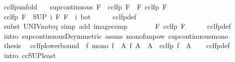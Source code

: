 \begin{isabellebody}
\isanewline
{}\isamarkupfalse%
\ cclfp{\isacharunderscore}unfold{\isacharcolon}\isanewline
\ \ \ {\isachardoublequoteopen}sup{\isacharunderscore}continuous\ F{\isachardoublequoteclose}\ \ {\isachardoublequoteopen}cclfp\ F\ {\isacharequal}\ F\ {\isacharparenleft}cclfp\ F{\isacharparenright}{\isachardoublequoteclose}\isanewline
%
\isadelimproof
%
\endisadelimproof
%
\isatagproof
{}\isamarkupfalse%
\ {\isacharminus}\isanewline
\ \ \isamarkupfalse%
\ {\isachardoublequoteopen}cclfp\ F\ {\isacharequal}\ {\isacharparenleft}SUP\ i{\isachardot}\ F\ {\isacharparenleft}{\isacharparenleft}F\ {\isacharcircum}{\isacharcircum}\ i{\isacharparenright}\ bot{\isacharparenright}{\isacharparenright}{\isachardoublequoteclose}\isanewline
\ \ \ \ \isamarkupfalse%
\ cclfp{\isacharunderscore}def\isanewline
\ \ \ \ \isamarkupfalse%
\ {\isacharparenleft}subst\ UNIV{\isacharunderscore}nat{\isacharunderscore}eq{\isacharparenright}\ {\isacharparenleft}simp\ add{\isacharcolon}\ image{\isacharunderscore}comp{\isacharparenright}\isanewline
\ \ \isamarkupfalse%
\ \isamarkupfalse%
\ {\isachardoublequoteopen}{\isasymdots}\ {\isacharequal}\ F\ {\isacharparenleft}cclfp\ F{\isacharparenright}{\isachardoublequoteclose}\isanewline
\ \ \ \ \isamarkupfalse%
\ cclfp{\isacharunderscore}def\isanewline
\ \ \ \ \isamarkupfalse%
\ {\isacharparenleft}intro\ sup{\isacharunderscore}continuousD{\isacharbrackleft}symmetric{\isacharbrackright}\ assms\ mono{\isacharunderscore}funpow\ sup{\isacharunderscore}continuous{\isacharunderscore}mono{\isacharparenright}\isanewline
\ \ \isamarkupfalse%
\ \isamarkupfalse%
\ {\isacharquery}thesis\ \isacommand{{\isachardot}}\isamarkupfalse%
\isanewline
{}\isamarkupfalse%
%
\endisatagproof
{\isafoldproof}%
%
\isadelimproof
\isanewline
%
\endisadelimproof
\isanewline
{}\isamarkupfalse%
\ cclfp{\isacharunderscore}lowerbound{\isacharcolon}\ \ f{\isacharcolon}\ {\isachardoublequoteopen}mono\ f{\isachardoublequoteclose}\ \ A{\isacharcolon}\ {\isachardoublequoteopen}f\ A\ {\isasymle}\ A{\isachardoublequoteclose}\ \ {\isachardoublequoteopen}cclfp\ f\ {\isasymle}\ A{\isachardoublequoteclose}\isanewline
%
\isadelimproof
\ \ %
\endisadelimproof
%
\isatagproof
{}\isamarkupfalse%
\ cclfp{\isacharunderscore}def\isanewline
{}\isamarkupfalse%
\ {\isacharparenleft}intro\ ccSUP{\isacharunderscore}least{\isacharparenright}\isanewline

\end{isabellebody}
